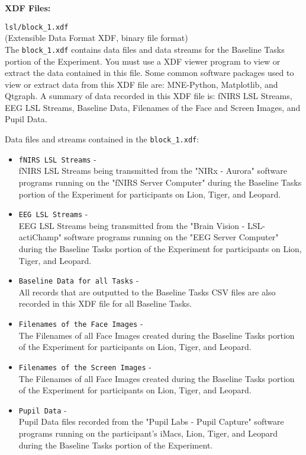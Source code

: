 \begin{description}
\bigskip\item\textbf{XDF Files:}
\medskip
\item\verb|lsl/block_1.xdf|\\(Extensible Data Format XDF, binary file format)\\
The \verb|block_1.xdf| contains data files and data streams for the Baseline Tasks portion of the Experiment. You must use a XDF viewer program to view or extract the data contained in this file. Some common software packages used to view or extract data from this XDF file are: MNE-Python, Matplotlib, and Qtgraph. A summary of data recorded in this XDF file is: fNIRS LSL Streams, EEG LSL Streams, Baseline Data, Filenames of the Face and Screen Images, and Pupil Data.

Data files and streams contained in the \verb|block_1.xdf|:

\begin{itemize}
    \item \verb|fNIRS LSL Streams| -\\fNIRS LSL Streams being transmitted from the "NIRx - Aurora" software programs running on the "fNIRS Server Computer" during the Baseline Tasks portion of the Experiment for participants on Lion, Tiger, and Leopard.
    \item \verb|EEG LSL Streams| -\\EEG LSL Streams being transmitted from the "Brain Vision - LSL-actiChamp" software programs running on the "EEG Server Computer" during the Baseline Tasks portion of the Experiment for participants on Lion, Tiger, and Leopard.
    \item \verb|Baseline Data for all Tasks| -\\All records that are outputted to the Baseline Tasks CSV files are also recorded in this XDF file for all Baseline Tasks.
    \item \verb|Filenames of the Face Images| -\\The Filenames of all Face Images created during the Baseline Tasks portion of the Experiment for participants on Lion, Tiger, and Leopard.
    \item \verb|Filenames of the Screen Images| -\\The Filenames of all Face Images created during the Baseline Tasks portion of the Experiment for participants on Lion, Tiger, and Leopard.
    \item \verb|Pupil Data| -\\Pupil Data files recorded from the "Pupil Labs - Pupil Capture" software programs running on the participant's iMacs, Lion, Tiger, and Leopard during the Baseline Tasks portion of the Experiment.
\end{itemize}



\end{description}
